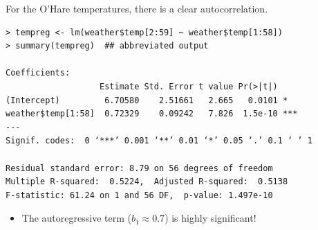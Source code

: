 \documentclass[12pt,xcolor=svgnames]{beamer}
\newcommand{\bl}{\color{blue}}
\newcommand{\nochap}{\vspace{0.5cm}}
\begin{document}
\begin{frame}[fragile]
\nochap

\vspace{-0.2cm}
For the O'Hare temperatures, there is a clear autocorrelation.

{\bl \footnotesize
\begin{verbatim}
> tempreg <- lm(weather$temp[2:59] ~ weather$temp[1:58])
> summary(tempreg)  ## abbreviated output

Coefficients:
                   Estimate Std. Error t value Pr(>|t|)    
(Intercept)         6.70580    2.51661   2.665   0.0101 *  
weather$temp[1:58]  0.72329    0.09242   7.826  1.5e-10 ***
---
Signif. codes:  0 ‘***’ 0.001 ‘**’ 0.01 ‘*’ 0.05 ‘.’ 0.1 ‘ ’ 1

Residual standard error: 8.79 on 56 degrees of freedom
Multiple R-squared:  0.5224,  Adjusted R-squared:  0.5138 
F-statistic: 61.24 on 1 and 56 DF,  p-value: 1.497e-10
\end{verbatim}
}

\vspace{-0.25cm}
\begin{itemize}
\item The autoregressive term ($b_1 \approx 0.7$) is highly significant!
\end{itemize}

\end{frame}
\end{document}
